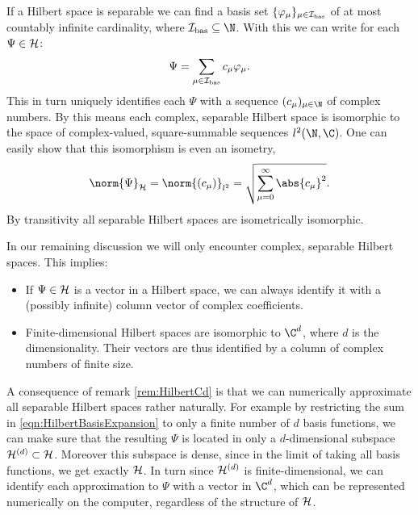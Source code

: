 \begin{rem}
	\label{rem:HilbertCd}
	If a Hilbert space is separable we can find a basis set
	$\{ \varphi_\mu \}_{\mu \in \mathcal{I}_\text{bas}}$
	of at most countably infinite cardinality,
	\ie where $\Ibas \subseteq \N$.
	With this we can write for each $\Psi \in \mathcal{H}$:
	\begin{equation}
		\Psi = \sum_{\mu \in \mathcal{I}_\text{bas}} c_\mu \varphi_\mu.
		\label{eqn:HilbertBasisExpansion}
	\end{equation}
	This in turn uniquely identifies each $\Psi$ with a sequence
	$(c_\mu)_{\mu\in\N}$ of complex numbers.
	By this means each complex, separable Hilbert space is
	isomorphic to the space of complex-valued, square-summable sequences $l^2(\N, \C)$.
	One can easily show that this isomorphism is even an isometry, \ie
	\[ \norm{\Psi}_\hilbert = \norm{(c_\mu)}_{l^2}
		= \sqrt{ \sum_{\mu=0}^\infty \abs{c_\mu}^2 }. \]
	By transitivity all separable Hilbert spaces are isometrically isomorphic.

	In our remaining discussion we will only encounter complex,
	separable Hilbert spaces. This implies:
	\begin{itemize}
		\item If $\Psi \in \mathcal{H}$ is a vector in a Hilbert space,
			we can always identify it with a
			(possibly infinite) column vector of complex coefficients.
		\item Finite-dimensional Hilbert spaces are isomorphic to $\C^d$,
			where $d$ is the dimensionality.
			Their vectors are thus identified by a column of complex numbers
			of finite size.
	\end{itemize}
\end{rem}

\begin{rem}
	\label{rem:HilbertApproximation}
A consequence of remark \ref{rem:HilbertCd} is that we can
numerically approximate all separable Hilbert spaces rather naturally.
For example by restricting the sum in \eqref{eqn:HilbertBasisExpansion}
to only a finite number of $d$ basis functions,
we can make sure that the resulting $\Psi$ is located
in only a $d$-dimensional subspace $\mathcal{H}^{(d)} \subset \mathcal{H}$.
Moreover this subspace is dense, since in the limit of taking
all basis functions, we get exactly $\mathcal{H}$.
In turn since $\mathcal{H}^{(d)}$ is finite-dimensional,
we can identify each approximation to $\Psi$ with a vector in $\C^d$,
which can be represented numerically on the computer,
regardless of the structure of $\mathcal{H}$.
\end{rem}

